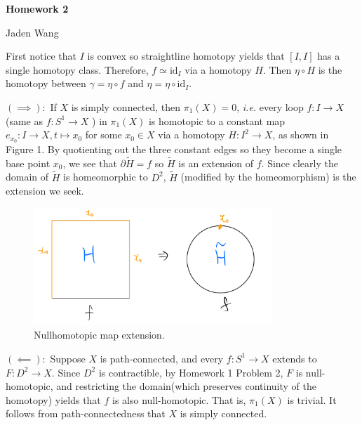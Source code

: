 \documentclass[12pt]{article}
\begin{document}
\centerline {\textsf{\textbf{\LARGE{Homework 2}}}}
\centerline {Jaden Wang}
\vspace{.15in}
\begin{problem}[1]
	First notice that $ I$ is convex so straightline homotopy yields that $ [I,I]$ has a single homotopy class. Therefore, $ f \simeq \text{id}_{ I}$ via a homotopy $ H$. Then $ \eta \circ H$ is the homotopy between $ \gamma= \eta \circ f $ and $ \eta = \eta \circ \text{id}_{ I}$.
\end{problem}
\begin{problem}[4]
$ (\implies):$ If $ X$ is simply connected, then  $ \pi_1(X) = 0$, \emph{i.e.} every loop $ f:I \to X$ (same as $ f: S^{1} \to X$ ) in $ \pi_1(X)$ is homotopic to a constant map $ e_{x_0}:I \to X, t \mapsto x_0$ for some $ x_0 \in X$ via a homotopy $ H: I^2 \to X$, as shown in Figure 1. By quotienting out the three constant edges so they become a single base point $ x_0$, we see that $ \partial \widetilde{ H} = f$ so $ \widetilde{ H}$ is an extension of $ f$. Since clearly the domain of $ \widetilde{ H}$ is homeomorphic to $D^2$, $ \widetilde{ H}$ (modified by the homeomorphism) is the extension we seek.
~\begin{figure}[H]
	\centering
	\includegraphics[width=0.8\textwidth]{./figures/extension.png}
	\caption{Nullhomotopic map extension.}
\end{figure}
 $ (\impliedby):$ Suppose $ X$ is path-connected, and every  $ f:S^{1} \to X$ extends to $ F:D^2 \to X$. Since $ D^2$ is contractible, by Homework 1 Problem 2, $ F$ is null-homotopic, and restricting the domain(which preserves continuity of the homotopy) yields that  $ f$ is also null-homotopic. That is,  $ \pi_1(X)$ is trivial. It follows from path-connectedness that $ X$ is simply connected.
\end{problem}
\end{document}
